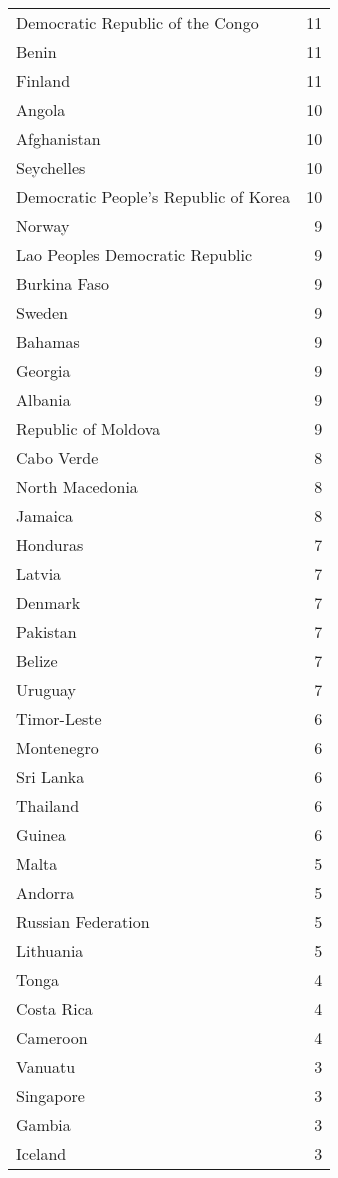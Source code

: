 {\begin{table}[ht!]
\begin{minipage}[t]{0.50\textwidth}
\begin{tabular}{lr}
        Democratic Republic of the Congo & 11 \\
        Benin & 11 \\
        Finland & 11 \\
        Angola & 10 \\
        Afghanistan & 10 \\
        Seychelles & 10 \\
        Democratic People’s Republic of Korea & 10 \\
        Norway & 9 \\
        Lao Peoples Democratic Republic & 9 \\
        Burkina Faso & 9 \\
        Sweden & 9 \\
        Bahamas & 9 \\
        Georgia & 9 \\
        Albania & 9 \\
        Republic of Moldova & 9 \\
        Cabo Verde & 8 \\
        North Macedonia & 8 \\
        Jamaica & 8 \\
        Honduras & 7 \\
        Latvia & 7 \\
        Denmark & 7 \\
        Pakistan & 7 \\
        Belize & 7 \\
        Uruguay & 7 \\
        Timor-Leste & 6 \\
        Montenegro & 6 \\
        Sri Lanka & 6 \\
        Thailand & 6 \\
        Guinea & 6 \\
        Malta & 5 \\
        Andorra & 5 \\
        Russian Federation & 5 \\
        Lithuania & 5 \\
        Tonga & 4 \\
        Costa Rica & 4 \\
        Cameroon & 4 \\
        Vanuatu & 3 \\
        Singapore & 3 \\
        Gambia & 3 \\
        Iceland & 3 \\

\end{tabular}
\end{minipage}
\end{table}}
